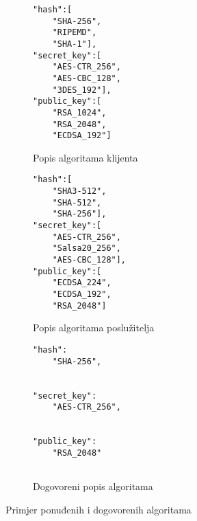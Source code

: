 \begin{figure}
\begin{subfigure}{0.33\linewidth}
\begin{framed}
\begin{small}
\begin{verbatim}
"hash":[
    "SHA-256",
    "RIPEMD",
    "SHA-1"],
"secret_key":[
    "AES-CTR_256",
    "AES-CBC_128",
    "3DES_192"],
"public_key":[
    "RSA_1024",
    "RSA_2048",
    "ECDSA_192"]
\end{verbatim}
\vspace{-15pt}
\end{small}
\end{framed}
\vspace{-10pt}
\caption{Popis algoritama klijenta}
\end{subfigure}
\begin{subfigure}{0.32\linewidth}
\begin{framed}
\begin{small}
\begin{verbatim}
"hash":[
    "SHA3-512",
    "SHA-512",
    "SHA-256"],
"secret_key":[
    "AES-CTR_256",
    "Salsa20_256",
    "AES-CBC_128"],
"public_key":[
    "ECDSA_224",
    "ECDSA_192",
    "RSA_2048"]
\end{verbatim}
\vspace{-15pt}
\end{small}
\end{framed}
\vspace{-10pt}
\caption{Popis algoritama poslužitelja}
\end{subfigure}
\begin{subfigure}{0.33\linewidth}
\begin{framed}
\begin{small}
\begin{verbatim}
"hash":
    "SHA-256",


"secret_key":
    "AES-CTR_256",


"public_key":
    "RSA_2048"


\end{verbatim}
\vspace{-15pt}
\end{small}
\end{framed}
\vspace{-10pt}
\caption{Dogovoreni popis algoritama}
\end{subfigure}
\caption{Primjer ponuđenih i dogovorenih algoritama}
\label{fig:neg_lists}
\end{figure}

